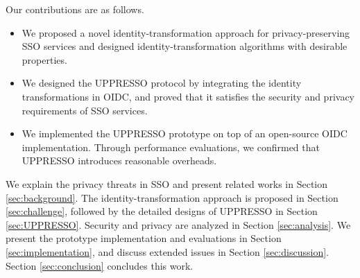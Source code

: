 Our contributions are as follows.
\begin{itemize}
\setlength{\topsep}{0pt}
\setlength{\partopsep}{0pt}
\setlength{\itemsep}{0pt}
\setlength{\parsep}{0pt}
\setlength{\parskip}{0pt}
\item We proposed a novel identity-transformation approach for privacy-preserving SSO services and designed identity-transformation algorithms with desirable properties.
\item We designed the UPPRESSO protocol by integrating the identity transformations in OIDC, and proved that it satisfies the security and privacy requirements of SSO services.
\item We implemented the UPPRESSO prototype on top of an open-source OIDC implementation. Through performance evaluations, we confirmed that UPPRESSO introduces reasonable overheads.
\end{itemize}


We explain the privacy threats in SSO and present related works in Section \ref{sec:background}.
The identity-transformation approach is proposed in Section \ref{sec:challenge}, followed by the detailed designs of UPPRESSO in Section \ref{sec:UPPRESSO}.
Security and privacy are analyzed in Section \ref{sec:analysis}.
We present the prototype implementation and evaluations in Section \ref{sec:implementation}, and discuss extended issues in Section \ref{sec:discussion}. Section \ref{sec:conclusion} concludes this work.
